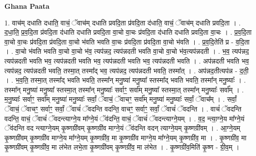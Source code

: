 \documentclass[17pt]{extarticle}
\begin{document}
\textbf{Ghana Paata } \newline

1. वाच॑म् दधाति दधाति॒ वाचं॒ ॅवाच॑म् दधाति प्रवदि॒ता प्र॑वदि॒ता द॑धाति॒ वाचं॒ ॅवाच॑म् दधाति प्रवदि॒ता । . द॒धा॒ति॒ प्र॒व॒दि॒ता प्र॑वदि॒ता द॑धाति दधाति प्रवदि॒ता वा॒चो वा॒चः प्र॑वदि॒ता द॑धाति दधाति प्रवदि॒ता वा॒चः । . प्र॒व॒दि॒ता वा॒चो वा॒चः प्र॑वदि॒ता प्र॑वदि॒ता वा॒चो भ॑वति भवति वा॒चः प्र॑वदि॒ता प्र॑वदि॒ता वा॒चो भ॑वति । . प्र॒व॒दि॒तेति॑ प्र - व॒दि॒ता । . वा॒चो भ॑वति भवति वा॒चो वा॒चो भ॑व॒ त्यप॑न्नद॒ त्यप॑न्नदती भवति वा॒चो वा॒चो भ॑व॒त्यप॑न्नदती । . भ॒व॒ त्यप॑न्नद॒ त्यप॑न्नदती भवति भव॒ त्यप॑न्नदती भवति भव॒ त्यप॑न्नदती भवति भव॒ त्यप॑न्नदती भवति । . अप॑न्नदती भवति भव॒ त्यप॑न्नद॒ त्यप॑न्नदती भवति॒ तस्मा॒त् तस्मा᳚द् भव॒ त्यप॑न्नद॒ त्यप॑न्नदती भवति॒ तस्मा᳚त् । . अप॑न्नद॒तीत्यप॑न्न - द॒ती॒ । . भ॒व॒ति॒ तस्मा॒त् तस्मा᳚द् भवति भवति॒ तस्मा᳚न् मनु॒ष्या॑ मनु॒ष्या᳚ स्तस्मा᳚द् भवति भवति॒ तस्मा᳚न् मनु॒ष्याः᳚ । . तस्मा᳚न् मनु॒ष्या॑ मनु॒ष्या᳚ स्तस्मा॒त् तस्मा᳚न् मनु॒ष्याः᳚ सर्वाꣳ॒॒ सर्वा᳚म् मनु॒ष्या᳚ स्तस्मा॒त् तस्मा᳚न् मनु॒ष्याः᳚ सर्वा᳚म् । . म॒नु॒ष्याः᳚ सर्वाꣳ॒॒ सर्वा᳚म् मनु॒ष्या॑ मनु॒ष्याः᳚ सर्वां॒ ॅवाचं॒ ॅवाचꣳ॒॒ सर्वा᳚म् मनु॒ष्या॑ मनु॒ष्याः᳚ सर्वां॒ ॅवाच᳚म् । . सर्वां॒ ॅवाचं॒ ॅवाचꣳ॒॒ सर्वाꣳ॒॒ सर्वां॒ ॅवाचं॑ ॅवदन्ति वदन्ति॒ वाचꣳ॒॒ सर्वाꣳ॒॒ सर्वां॒ ॅवाचं॑ ॅवदन्ति । . वाचं॑ ॅवदन्ति वदन्ति॒ वाचं॒ ॅवाचं॑ ॅवदन्त्याग्ने॒य मा᳚ग्ने॒यं ॅव॑दन्ति॒ वाचं॒ ॅवाचं॑ ॅवदन्त्याग्ने॒यम् । . व॒द॒ न्त्या॒ग्ने॒य मा᳚ग्ने॒यं ॅव॑दन्ति वद न्त्याग्ने॒यम् कृ॒ष्णग्री॑वम् कृ॒ष्णग्री॑व माग्ने॒यं ॅव॑दन्ति वदन् त्याग्ने॒यम् कृ॒ष्णग्री॑वम् । . आ॒ग्ने॒यम् कृ॒ष्णग्री॑वम् कृ॒ष्णग्री॑व माग्ने॒य मा᳚ग्ने॒यम् कृ॒ष्णग्री॑व॒ मा कृ॒ष्णग्री॑व माग्ने॒य मा᳚ग्ने॒यम् कृ॒ष्णग्री॑व॒ मा । . कृ॒ष्णग्री॑व॒ मा कृ॒ष्णग्री॑वम् कृ॒ष्णग्री॑व॒ मा ल॑भेत लभे॒ता कृ॒ष्णग्री॑वम् कृ॒ष्णग्री॑व॒ मा ल॑भेत । . कृ॒ष्णग्री॑व॒मिति॑ कृ॒ष्ण - ग्री॒व॒म् । \newline
\end{document}

